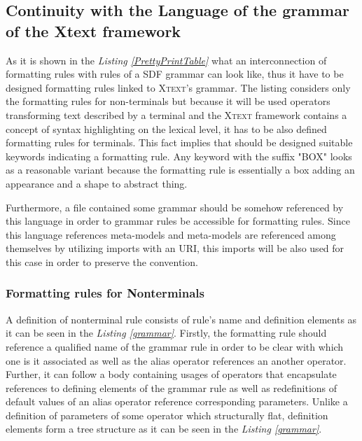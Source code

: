 \documentclass[12pt,notitlepage,a4paper]{report}
\begin{document}
\subsection{Continuity with the Language of the grammar of the Xtext framework}
As it is shown in the \textit{Listing \ref{PrettyPrintTable}} what an interconnection of formatting rules with rules of a SDF grammar  can look like, thus it have to be designed  formatting rules linked to \textsc{Xtext}'s grammar.  The listing considers only the formatting rules for non-terminals but because it will be used operators transforming text described by a terminal and the \textsc{Xtext} framework contains a concept of syntax highlighting on the lexical level, it has to be also defined formatting rules for terminals. This fact implies that should be designed suitable keywords indicating a formatting rule. Any keyword with the suffix "BOX" looks as a reasonable variant because the formatting rule is essentially a box adding an appearance and a shape to abstract thing.

Furthermore, a file contained some grammar  should be somehow referenced by this language in order to grammar rules be accessible for formatting rules. Since this language references meta-models and meta-models are referenced among themselves by utilizing imports with an URI, this imports will be also used for this case in order to preserve the convention.

\subsubsection{Formatting rules for Nonterminals}

A definition of nonterminal rule consists of rule's name and definition elements as it can be seen in the \textit{Listing \ref{grammar}}. Firstly, the formatting rule should reference a qualified name of the grammar rule in order to be clear with which one is it associated as well as the alias operator references an another operator. Further, it can follow a body containing usages of operators that encapsulate references to defining elements of the grammar rule as well as redefinitions of default values of an alias operator reference corresponding parameters. Unlike a definition of parameters of some operator which structurally flat, definition elements form a tree structure as it can be seen in the \textit{Listing \ref{grammar}}.
\end{document}
